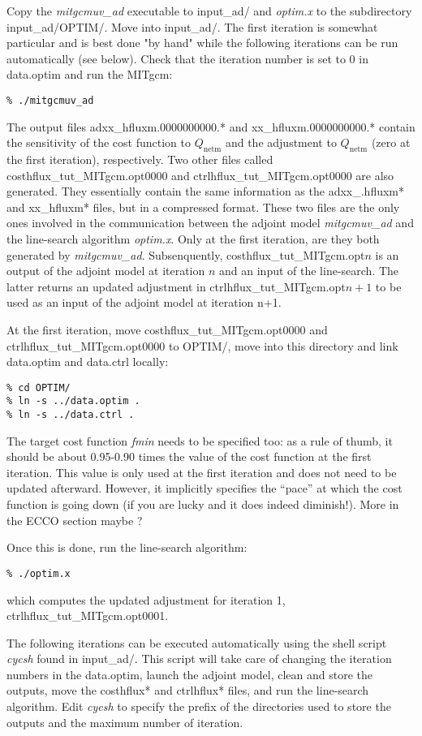 Copy the {\it mitgcmuv\_ad} executable to input\_ad/ and {\it optim.x} to the
subdirectory input\_ad/OPTIM/. Move into input\_ad/. The first iteration is
somewhat particular and is best done "by hand" while the following iterations
can be run automatically (see below). Check that the iteration number is set
to 0 in data.optim and run the MITgcm:
\begin{verbatim}
% ./mitgcmuv_ad
\end{verbatim}

The output files adxx\_hfluxm.0000000000.* and xx\_hfluxm.0000000000.* contain
the sensitivity of the cost function to $Q_\mathrm{netm}$ and the adjustment
to $Q_\mathrm{netm}$ (zero at the first iteration), respectively. Two other
files called costhflux\_tut\_MITgcm.opt0000 and ctrlhflux\_tut\_MITgcm.opt0000
are also generated. They essentially contain the same information as the
adxx\_.hfluxm* and xx\_hfluxm* files, but in a compressed format. These two files
are the only ones involved in the communication between the adjoint model
{\it mitgcmuv\_ad} and the line-search algorithm {\it optim.x}. Only at the first
iteration, are they both generated by {\it mitgcmuv\_ad}. Subsenquently,
costhflux\_tut\_MITgcm.opt$n$ is an output of the adjoint model at
iteration $n$ and an input of the line-search. The latter returns an updated
adjustment in ctrlhflux\_tut\_MITgcm.opt$n+1$ to be used as an input of the
adjoint model at iteration n+1. 

At the first iteration, move costhflux\_tut\_MITgcm.opt0000 and
ctrlhflux\_tut\_MITgcm.opt0000 to OPTIM/, move into this directory and link data.optim 
and data.ctrl locally:
\begin{verbatim}
% cd OPTIM/
% ln -s ../data.optim .
% ln -s ../data.ctrl .
\end{verbatim}
The target cost function {\it fmin} needs to be specified too: as a rule of thumb,
it should be about 0.95-0.90 times the value of the cost function at
the first iteration. This value is only used at the first iteration and does
not need to be updated afterward. However, it implicitly specifies the
``pace'' at which the cost function is going down (if you are lucky and it does
indeed diminish!). More in the ECCO section maybe ?

Once this is done, run the line-search algorithm:
\begin{verbatim}
% ./optim.x
\end{verbatim}
which computes the updated adjustment for iteration 1, ctrlhflux\_tut\_MITgcm.opt0001.

The following iterations can be executed automatically using the shell
script {\it cycsh} found in input\_ad/. This script will take care of changing
the iteration numbers in the data.optim, launch the adjoint model, clean and
store the outputs, move the costhflux* and ctrlhflux* files, and run the
line-search algorithm. Edit {\it cycsh} to specify the prefix of the
directories used to store the outputs and the maximum number of iteration.

